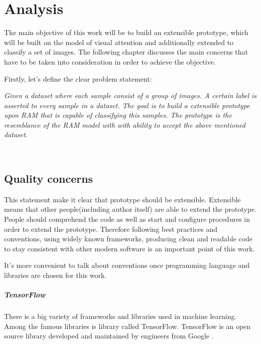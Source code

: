 \chapter{Analysis}
\label{ch:analysis}
The main objective of this work will be to build an extensible prototype,
which will be built on the model of visual attention and additionally
extended to classify
a set of images. The following chapter discusses the main concerns
that have to be taken into consideration in order to achieve the objective.

Firstly, let's define the clear problem statement:

\textit{
	Given a dataset where each sample consist of a group of images.
	A certain label is asserted to every sample in a dataset. The goal is
	to build a extensible prototype upon RAM that is capable of classifying
	this samples. The prototype is the resemblance of the RAM model with
	with ability to accept the above mentioned dataset.
}

\\


\section{Quality concerns}
\label{sec:quality_concerns}
This statement make it clear that prototype should be extensible. Extensible
means that other people(including author itself) are able to extend the
prototype. People should comprehend the code as well as start and configure
procedures in order to extend the prototype. Therefore following best practices
and conventions, using widely known frameworks, producing clean and readable code
to stay consistent with other modern software is an important
point of this work.

It's more convenient to talk about conventions once programming language and
libraries are chosen for this work.
\paragraph{TensorFlow}

There is a big variety of frameworks and libraries used in machine learning.
Among the famous libraries is library called TensorFlow. TensorFlow is an open
source library developed and maintained by engineers from Google \cite{tensorflow2015-whitepaper}.


